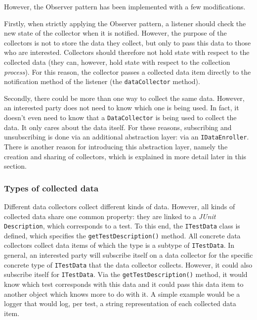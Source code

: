 \documentclass[i2]{oss}
\newcommand{\class}[1]{\texttt{#1}}
\newcommand{\method}[1]{\texttt{#1}}
\newcommand{\junit}{\emph{JUnit }}
\begin{document}
However, the Observer pattern has been implemented with a few modifications.

Firstly, when strictly applying the Observer pattern, a listener should check the new state of the collector when it is notified.
However, the purpose of the collectors is not to store the data they collect, but only to pass this data to those who are interested.
Collectors should therefore not hold state with respect to the collected data (they can, however, hold state with respect to the collection \emph{process}). 
For this reason, the collector passes a collected data item directly to the notification method of the listener (the \method{dataCollector} method).

Secondly, there could be more than one way to collect the same data.
However, an interested party does not need to know which one is being used.
In fact, it doesn't even need to know that a \class{DataCollector} is being used to collect the data.
It only cares about the data itself.
For these reasons, subscribing and unsubscribing is done via an additional abstraction layer: via an \class{IDataEnroller}.
There is another reason for introducing this abstraction layer, namely the creation and sharing of collectors, which is explained in more detail later in this section.

\subsubsection{Types of collected data}

Different data collectors collect different kinds of data.
However, all kinds of collected data share one common property: they are linked to a \junit \class{Description}, which corresponds to a test.
To this end, the \class{ITestData} class is defined, which specifies the \method{getTestDescription()} method.
All concrete data collectors collect data items of which the type is a subtype of \class{ITestData}.
In general, an interested party will subscribe itself on a data collector for the specific concrete type of \class{ITestData} that the data collector collects.
However, it could also subscribe itself for \class{ITestData}.
Via the \method{getTestDescription()} method, it would know which test corresponds with this data and it could pass this data item to another object which knows more to do with it.
A simple example would be a logger that would log, per test, a string representation of each collected data item.
\end{document}

